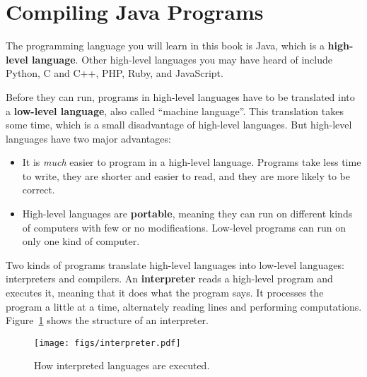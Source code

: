 \section{Compiling Java Programs}


The programming language you will learn in this book is Java, which is a {\bf high-level language}.
Other high-level languages you may have heard of include Python, C and C++, PHP, Ruby, and JavaScript.


Before they can run, programs in high-level languages have to be translated into a {\bf low-level language}, also called ``machine language''.
This translation takes some time, which is a small disadvantage of high-level languages.
But high-level languages have two major advantages:

\begin{itemize}

\item It is {\em much} easier to program in a high-level language.
Programs take less time to write, they are shorter and easier to read, and they are more likely to be correct.


\item High-level languages are {\bf portable}, meaning they can run on different kinds of computers with few or no modifications.
Low-level programs can run on only one kind of computer. %

\end{itemize}


Two kinds of programs translate high-level languages into low-level languages: interpreters and compilers.
An {\bf interpreter} reads a high-level program and executes it, meaning that it does what the program says.
It processes the program a little at a time, alternately reading lines and performing computations.
Figure~\ref{fig.interpreter} shows the structure of an interpreter.

\begin{figure}[!ht]
\begin{center}
\texttt{[image: figs/interpreter.pdf]}
\caption{How interpreted languages are executed.}
\label{fig.interpreter}
\end{center}
\end{figure}

